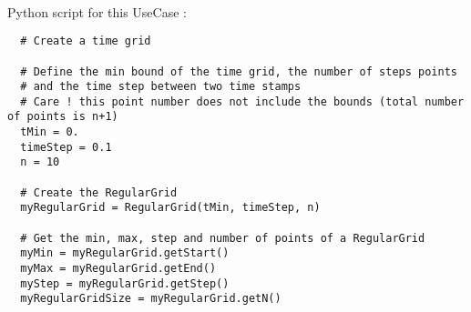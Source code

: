 \textspace\\
Python script for this UseCase :

\begin{lstlisting}
  # Create a time grid

  # Define the min bound of the time grid, the number of steps points
  # and the time step between two time stamps
  # Care ! this point number does not include the bounds (total number of points is n+1)
  tMin = 0.
  timeStep = 0.1
  n = 10

  # Create the RegularGrid
  myRegularGrid = RegularGrid(tMin, timeStep, n)

  # Get the min, max, step and number of points of a RegularGrid
  myMin = myRegularGrid.getStart()
  myMax = myRegularGrid.getEnd()
  myStep = myRegularGrid.getStep()
  myRegularGridSize = myRegularGrid.getN()


\end{lstlisting}



